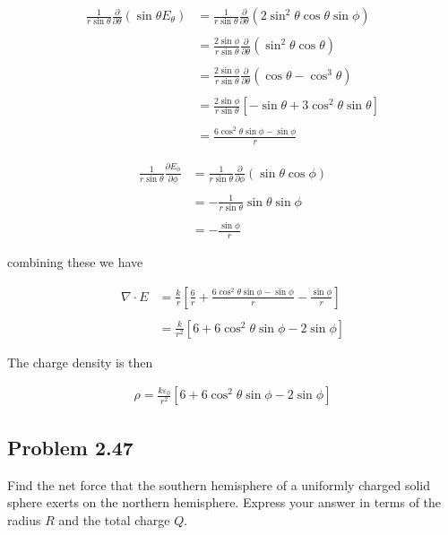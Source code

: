 \documentclass{article}
\begin{document}
\begin{align*}
    \frac{1}{r\sin\theta}\frac{\partial}{\partial \theta}\left(\sin\theta E_\theta\right) &= \frac{1}{r\sin\theta}\frac{\partial }{\partial \theta}(2\sin^2\theta\cos\theta\sin\phi) \\
    \\
    &= \frac{2\sin\phi}{r\sin\theta}\frac{\partial}{\partial \theta}
    (\sin^2\theta\cos\theta)\\
    \\
    &= \frac{2\sin\phi}{r\sin\theta}\frac{\partial}{\partial \theta}(\cos\theta - \cos^3\theta)\\
    \\
    &= \frac{2\sin\phi}{r\sin\theta}\left[-\sin\theta + 3\cos^2\theta\sin\theta\right]\\
    \\
    &= \frac{6\cos^2\theta\sin\phi - \sin\phi}{r}
\end{align*}

\begin{align*}
    \frac{1}{r\sin\theta}\frac{\partial E_\phi}{\partial \phi} &= \frac{1}{r\sin\theta} \frac{\partial }{\partial \phi}(\sin\theta\cos\phi)\\
    \\
    &= -\frac{1}{r\sin\theta}\sin\theta\sin\phi\\
    \\
    &= -\frac{\sin\phi}{r}
\end{align*}

combining these we have 

\begin{align*}
    \nabla \cdot E &= \frac{k}{r}\left[ \frac{6}{r} +  \frac{6\cos^2\theta\sin\phi - \sin\phi}{r} -\frac{\sin\phi}{r}\right]\\
    \\
    &=\frac{k}{r^2}\left[6 + 6\cos^2\theta\sin\phi - 2\sin\phi\right]
\end{align*}

The charge density is then 

\begin{align*}
    \rho = \frac{k\varepsilon_0}{r^2}\left[6 + 6\cos^2\theta\sin\phi - 2\sin\phi\right]
\end{align*}

\newpage

\subsection*{Problem 2.47}
 Find the net force that the southern hemisphere of a uniformly
 charged solid sphere exerts on the northern hemisphere. Express your answer in
 terms of the radius $R$ and the total charge $Q$.
\end{document}
